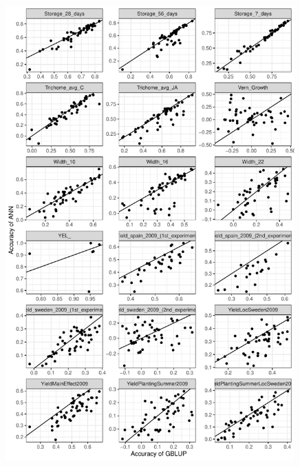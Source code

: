 \begin{figure}[H]
  \centering \includegraphics[height=0.99\textheight, width=0.99\textwidth]{Figures/gray_cor_plots_7}
  \decoRule
 \label{fig:bla}
\end{figure}

